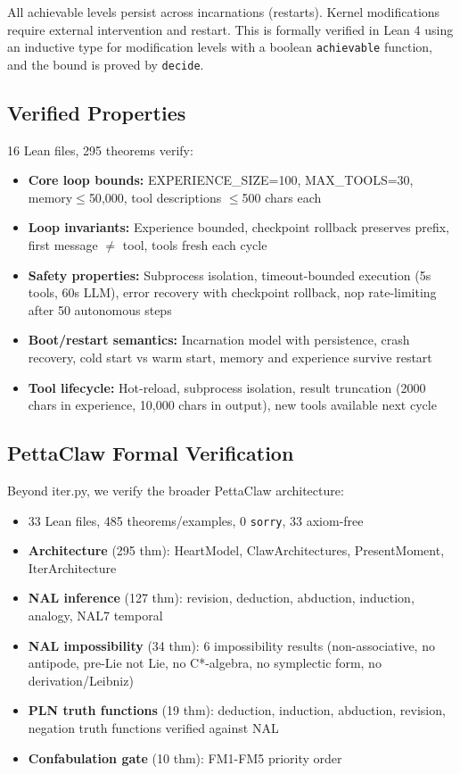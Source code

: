 \documentclass{article}
\begin{document}
All achievable levels persist across incarnations (restarts). Kernel modifications require external intervention and restart. This is formally verified in Lean 4 using an inductive type for modification levels with a boolean \texttt{achievable} function, and the bound is proved by \texttt{decide}.

\subsection{Verified Properties}

16 Lean files, 295 theorems verify:
\begin{itemize}
    \item \textbf{Core loop bounds:} EXPERIENCE\_SIZE=100, MAX\_TOOLS=30, memory$\leq$50{,}000, tool descriptions $\leq$500 chars each
    \item \textbf{Loop invariants:} Experience bounded, checkpoint rollback preserves prefix, first message $\neq$ tool, tools fresh each cycle
    \item \textbf{Safety properties:} Subprocess isolation, timeout-bounded execution (5s tools, 60s LLM), error recovery with checkpoint rollback, nop rate-limiting after 50 autonomous steps
    \item \textbf{Boot/restart semantics:} Incarnation model with persistence, crash recovery, cold start vs warm start, memory and experience survive restart
    \item \textbf{Tool lifecycle:} Hot-reload, subprocess isolation, result truncation (2000 chars in experience, 10{,}000 chars in output), new tools available next cycle
\end{itemize}

\subsection{PettaClaw Formal Verification}

Beyond iter.py, we verify the broader PettaClaw architecture:
\begin{itemize}
    \item 33 Lean files, 485 theorems/examples, 0 \texttt{sorry}, 33 axiom-free
    \item \textbf{Architecture} (295 thm): HeartModel, ClawArchitectures, PresentMoment, IterArchitecture
    \item \textbf{NAL inference} (127 thm): revision, deduction, abduction, induction, analogy, NAL7 temporal
    \item \textbf{NAL impossibility} (34 thm): 6 impossibility results (non-associative, no antipode, pre-Lie not Lie, no C*-algebra, no symplectic form, no derivation/Leibniz)
    \item \textbf{PLN truth functions} (19 thm): deduction, induction, abduction, revision, negation truth functions verified against NAL
    \item \textbf{Confabulation gate} (10 thm): FM1-FM5 priority order
\end{itemize}
\end{document}
